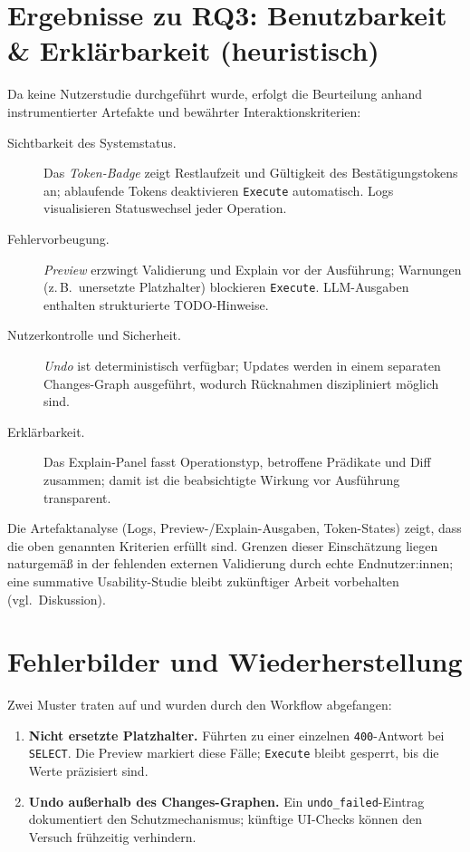 \section{Ergebnisse zu RQ3: Benutzbarkeit \& Erklärbarkeit (heuristisch)}
\label{sec:ergebnisse-rq3}

Da keine Nutzerstudie durchgeführt wurde, erfolgt die Beurteilung anhand instrumentierter Artefakte und bewährter Interaktionskriterien:

\begin{description}
  \item[Sichtbarkeit des Systemstatus.] Das \emph{Token-Badge} zeigt Restlaufzeit und Gültigkeit des Bestätigungstokens an; ablaufende Tokens deaktivieren \texttt{Execute} automatisch. Logs visualisieren Statuswechsel jeder Operation.
  \item[Fehlervorbeugung.] \emph{Preview} erzwingt Validierung und Explain vor der Ausführung; Warnungen (z.\,B.\ unersetzte Platzhalter) blockieren \texttt{Execute}. LLM-Ausgaben enthalten strukturierte TODO-Hinweise.
  \item[Nutzerkontrolle und Sicherheit.] \emph{Undo} ist deterministisch verfügbar; Updates werden in einem separaten Changes-Graph ausgeführt, wodurch Rücknahmen diszipliniert möglich sind.
  \item[Erklärbarkeit.] Das Explain-Panel fasst Operationstyp, betroffene Prädikate und Diff zusammen; damit ist die beabsichtigte Wirkung vor Ausführung transparent.
\end{description}

Die Artefaktanalyse (Logs, Preview-/Explain-Ausgaben, Token-States) zeigt, dass die oben genannten Kriterien erfüllt sind. Grenzen dieser Einschätzung liegen naturgemäß in der fehlenden externen Validierung durch echte Endnutzer:innen; eine summative Usability-Studie bleibt zukünftiger Arbeit vorbehalten (vgl.\ Diskussion).

\section{Fehlerbilder und Wiederherstellung}
\label{sec:fehlerbilder}

Zwei Muster traten auf und wurden durch den Workflow abgefangen:
\begin{enumerate}
  \item \textbf{Nicht ersetzte Platzhalter.} Führten zu einer einzelnen \texttt{400}-Antwort bei \texttt{SELECT}. Die Preview markiert diese Fälle; \texttt{Execute} bleibt gesperrt, bis die Werte präzisiert sind.
  \item \textbf{Undo außerhalb des Changes-Graphen.} Ein \texttt{undo\_failed}-Eintrag dokumentiert den Schutzmechanismus; künftige UI-Checks können den Versuch frühzeitig verhindern.
\end{enumerate}

